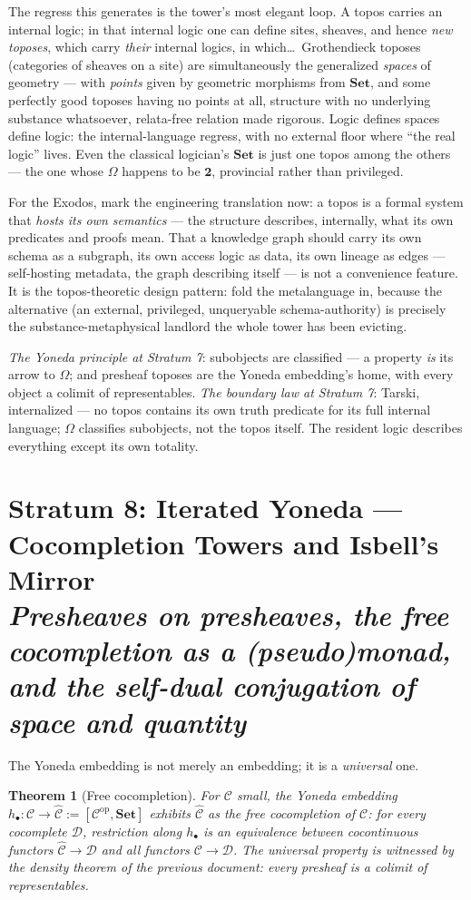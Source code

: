\documentclass[11pt]{article}
\theoremstyle{plain}
\newtheorem{theorem}{Theorem}[section]
\theoremstyle{definition}
\theoremstyle{remark}
\newcommand{\C}{\mathcal{C}}
\newcommand{\D}{\mathcal{D}}
\newcommand{\Set}{\mathbf{Set}}
\newcommand{\op}{\mathrm{op}}
\newcommand{\stratum}[2]{\section{#1 \\ {\normalsize\normalfont\itshape #2}}}
\begin{document}
The regress this generates is the tower's most elegant loop. A topos carries an internal logic; in that internal logic one can define sites, sheaves, and hence \emph{new toposes}, which carry \emph{their} internal logics, in which\dots\ Grothendieck toposes (categories of sheaves on a site) are simultaneously the generalized \emph{spaces} of geometry --- with \emph{points} given by geometric morphisms from $\Set$, and some perfectly good toposes having no points at all, structure with no underlying substance whatsoever, relata-free relation made rigorous. Logic defines spaces define logic: the internal-language regress, with no external floor where ``the real logic'' lives. Even the classical logician's $\Set$ is just one topos among the others --- the one whose $\Omega$ happens to be $\mathbf{2}$, provincial rather than privileged.

For the Exodos, mark the engineering translation now: a topos is a formal system that \emph{hosts its own semantics} --- the structure describes, internally, what its own predicates and proofs mean. That a knowledge graph should carry its own schema as a subgraph, its own access logic as data, its own lineage as edges --- self-hosting metadata, the graph describing itself --- is not a convenience feature. It is the topos-theoretic design pattern: fold the metalanguage in, because the alternative (an external, privileged, unqueryable schema-authority) is precisely the substance-metaphysical landlord the whole tower has been evicting.

\begin{refrain}
\emph{The Yoneda principle at Stratum 7}: subobjects are classified --- a property \emph{is} its arrow to $\Omega$; and presheaf toposes are the Yoneda embedding's home, with every object a colimit of representables. \emph{The boundary law at Stratum 7}: Tarski, internalized --- no topos contains its own truth predicate for its full internal language; $\Omega$ classifies subobjects, not the topos itself. The resident logic describes everything except its own totality.
\end{refrain}

\stratum{Stratum 8: Iterated Yoneda --- Cocompletion Towers and Isbell's Mirror}{Presheaves on presheaves, the free cocompletion as a (pseudo)monad, and the self-dual conjugation of space and quantity}

The Yoneda embedding is not merely an embedding; it is a \emph{universal} one.

\begin{theorem}[Free cocompletion]\label{thm:cocompletion}
For $\C$ small, the Yoneda embedding $h_\bullet\colon \C \to \widehat{\C} := [\C^{\op},\Set]$ exhibits $\widehat{\C}$ as the free cocompletion of $\C$: for every cocomplete $\D$, restriction along $h_\bullet$ is an equivalence between cocontinuous functors $\widehat{\C} \to \D$ and all functors $\C \to \D$. The universal property is witnessed by the density theorem of the previous document: every presheaf is a colimit of representables.
\end{theorem}
\end{document}
